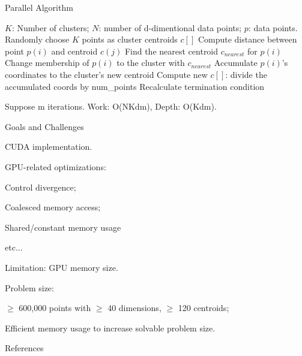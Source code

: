 \documentclass[
nopagebreaks,
style=klope,
fleqn]{powerdot}
\begin{document}
\begin{slide} {Parallel Algorithm}
  \footnotesize
  \begin{algorithmic}[1]
    \INPUT $K$: Number of clusters; $N$: number of d-dimentional data points; $p$: data points.
     \label{alg:p}
    \State Randomly choose $K$ points as cluster centroids $c[]$
    \State Compute distance between point $p(i)$ and centroid $c(j)$
    \EndFor
    \State Find the nearest centroid $c_{nearest}$ for $p(i)$
    \State Change membership of $p(i)$ to the cluster with $c_{nearest}$
    \State Accumulate $p(i)$'s coordinates to the cluster's new centroid
    \EndParFor
    \State Compute new $c[]$: divide the accumulated coords by num\_points
    \State Recalculate termination condition
    \EndWhile
    \EndFunction  
  \end{algorithmic}
  \begin{compactitem}
    \vspace{5mm}
  \item{Suppose m iterations. 
    Work: O(NKdm), Depth: O(Kdm).}
  \end{compactitem}
\end{slide}

\begin{slide}{Goals and Challenges}
  \begin{compactitem}
    \item{CUDA implementation.}
    \item{GPU-related optimizations:}
    \begin{compactitem}
    \item{Control divergence;}
    \item{Coalesced memory access;}
    \item{Shared/constant memory usage}
    \item{etc...}
    \end{compactitem}
  \item{Limitation: GPU memory size.}
   \item{Problem size:}
     \begin{compactitem}
     \item{$\geq$ 600,000 points with $\geq$ 40 dimensions, $\geq$ 120 centroids;}
     \item{Efficient memory usage to increase solvable problem size.}
     \end{compactitem}
  \end{compactitem}
\end{slide}

\begin{slide} {References}
\footnotesize


\end{slide}
\end{document}
